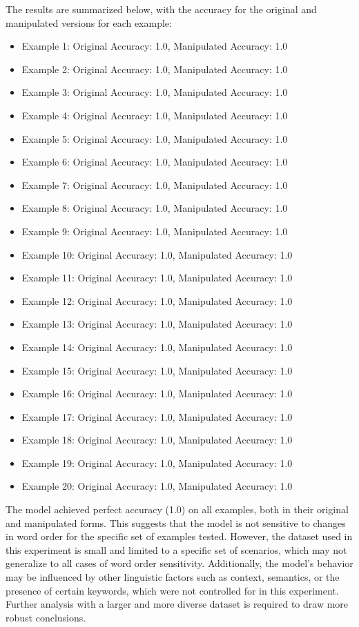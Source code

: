 \documentclass{article}
\begin{document}
The results are summarized below, with the accuracy for the original and manipulated versions for each example:

\begin{itemize}
    \item Example 1: Original Accuracy: 1.0, Manipulated Accuracy: 1.0
    \item Example 2: Original Accuracy: 1.0, Manipulated Accuracy: 1.0
    \item Example 3: Original Accuracy: 1.0, Manipulated Accuracy: 1.0
    \item Example 4: Original Accuracy: 1.0, Manipulated Accuracy: 1.0
    \item Example 5: Original Accuracy: 1.0, Manipulated Accuracy: 1.0
    \item Example 6: Original Accuracy: 1.0, Manipulated Accuracy: 1.0
    \item Example 7: Original Accuracy: 1.0, Manipulated Accuracy: 1.0
    \item Example 8: Original Accuracy: 1.0, Manipulated Accuracy: 1.0
    \item Example 9: Original Accuracy: 1.0, Manipulated Accuracy: 1.0
    \item Example 10: Original Accuracy: 1.0, Manipulated Accuracy: 1.0
    \item Example 11: Original Accuracy: 1.0, Manipulated Accuracy: 1.0
    \item Example 12: Original Accuracy: 1.0, Manipulated Accuracy: 1.0
    \item Example 13: Original Accuracy: 1.0, Manipulated Accuracy: 1.0
    \item Example 14: Original Accuracy: 1.0, Manipulated Accuracy: 1.0
    \item Example 15: Original Accuracy: 1.0, Manipulated Accuracy: 1.0
    \item Example 16: Original Accuracy: 1.0, Manipulated Accuracy: 1.0
    \item Example 17: Original Accuracy: 1.0, Manipulated Accuracy: 1.0
    \item Example 18: Original Accuracy: 1.0, Manipulated Accuracy: 1.0
    \item Example 19: Original Accuracy: 1.0, Manipulated Accuracy: 1.0
    \item Example 20: Original Accuracy: 1.0, Manipulated Accuracy: 1.0
\end{itemize}

The model achieved perfect accuracy (1.0) on all examples, both in their original and manipulated forms. This suggests that the model is not sensitive to changes in word order for the specific set of examples tested. However, the dataset used in this experiment is small and limited to a specific set of scenarios, which may not generalize to all cases of word order sensitivity. Additionally, the model's behavior may be influenced by other linguistic factors such as context, semantics, or the presence of certain keywords, which were not controlled for in this experiment. Further analysis with a larger and more diverse dataset is required to draw more robust conclusions.
\end{document}
